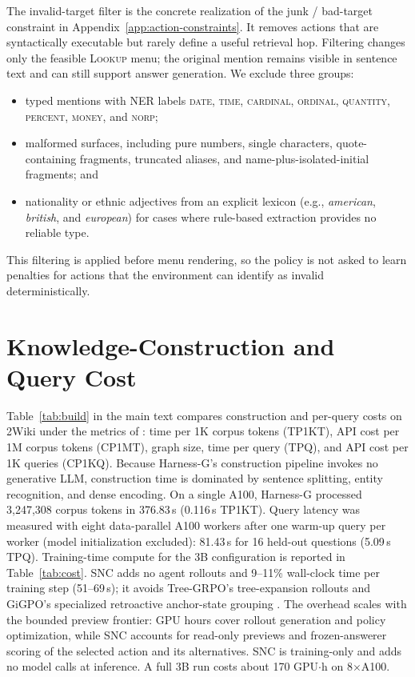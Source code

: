 \documentclass[letterpaper]{article} %
\begin{document}
The invalid-target filter is the concrete realization of the junk / bad-target constraint in Appendix~\ref{app:action-constraints}.
It removes actions that are syntactically executable but rarely define a useful retrieval hop.
Filtering changes only the feasible \textsc{Lookup} menu; the original mention remains visible in sentence text and can still support answer generation.
We exclude three groups:
\begin{itemize}
    \item typed mentions with NER labels \textsc{date}, \textsc{time}, \textsc{cardinal}, \textsc{ordinal}, \textsc{quantity}, \textsc{percent}, \textsc{money}, and \textsc{norp};
    \item malformed surfaces, including pure numbers, single characters, quote-containing fragments, truncated aliases, and name-plus-isolated-initial fragments; and
    \item nationality or ethnic adjectives from an explicit lexicon (e.g., \emph{american}, \emph{british}, and \emph{european}) for cases where rule-based extraction provides no reliable type.
\end{itemize}
This filtering is applied before menu rendering, so the policy is not asked to learn penalties for actions that the environment can identify as invalid deterministically.

\section{Knowledge-Construction and Query Cost}
\label{app:cost}

Table~\ref{tab:build} in the main text compares construction and per-query costs on 2Wiki under the metrics of \citet{luo2025graphr1}: time per 1K corpus tokens (TP1KT), API cost per 1M corpus tokens (CP1MT), graph size, time per query (TPQ), and API cost per 1K queries (CP1KQ).
Because Harness-G's construction pipeline invokes no generative LLM, construction time is dominated by sentence splitting, entity recognition, and dense encoding.
On a single A100, Harness-G processed 3{,}247{,}308 corpus tokens in 376.83\,s (0.116\,s TP1KT).
Query latency was measured with eight data-parallel A100 workers after one warm-up query per worker (model initialization excluded): 81.43\,s for 16 held-out questions (5.09\,s TPQ).
Training-time compute for the 3B configuration is reported in Table~\ref{tab:cost}.
SNC adds no agent rollouts and 9--11\% wall-clock time per training step (51--69\,s); it avoids Tree-GRPO's tree-expansion rollouts and GiGPO's specialized retroactive anchor-state grouping \citep{treegrpo2025,feng2025gigpo}.
The overhead scales with the bounded preview frontier: GPU hours cover rollout generation and policy optimization, while SNC accounts for read-only previews and frozen-answerer scoring of the selected action and its alternatives.
SNC is training-only and adds no model calls at inference.
A full 3B run costs about 170 GPU$\cdot$h on 8$\times$A100.
\end{document}
